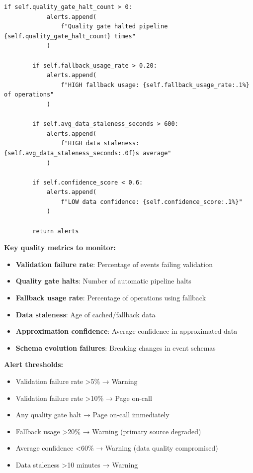 \begin{lstlisting}[style=python, caption={Quality Monitoring Dashboard}]
        if self.quality_gate_halt_count > 0:
            alerts.append(
                f"Quality gate halted pipeline {self.quality_gate_halt_count} times"
            )

        if self.fallback_usage_rate > 0.20:
            alerts.append(
                f"HIGH fallback usage: {self.fallback_usage_rate:.1%} of operations"
            )

        if self.avg_data_staleness_seconds > 600:
            alerts.append(
                f"HIGH data staleness: {self.avg_data_staleness_seconds:.0f}s average"
            )

        if self.confidence_score < 0.6:
            alerts.append(
                f"LOW data confidence: {self.confidence_score:.1%}"
            )

        return alerts
\end{lstlisting}

\textbf{Key quality metrics to monitor:}
\begin{itemize}
    \item \textbf{Validation failure rate}: Percentage of events failing validation
    \item \textbf{Quality gate halts}: Number of automatic pipeline halts
    \item \textbf{Fallback usage rate}: Percentage of operations using fallback
    \item \textbf{Data staleness}: Age of cached/fallback data
    \item \textbf{Approximation confidence}: Average confidence in approximated data
    \item \textbf{Schema evolution failures}: Breaking changes in event schemas
\end{itemize}

\textbf{Alert thresholds:}
\begin{itemize}
    \item Validation failure rate >5\% → Warning
    \item Validation failure rate >10\% → Page on-call
    \item Any quality gate halt → Page on-call immediately
    \item Fallback usage >20\% → Warning (primary source degraded)
    \item Average confidence <60\% → Warning (data quality compromised)
    \item Data staleness >10 minutes → Warning
\end{itemize}

